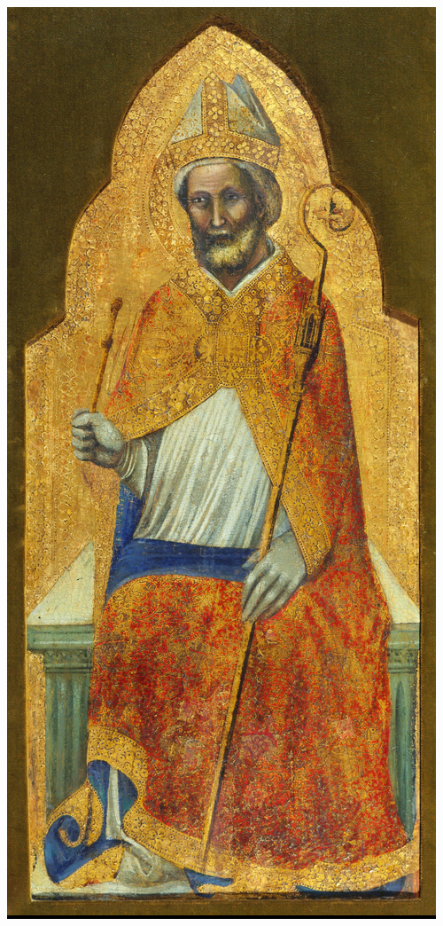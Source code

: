 \documentclass[hidelinks,12pt,a4paper,openright,twoside]{book}
\begin{document}
	
	\newpage
		
	
	\begin{minipage}{\linewidth}
		
		\begin{minipage}{0.4\linewidth}
			\begin{center}
				\colorbox{black}{\includegraphics[scale=0.06]{Vitale_da_Bologna-Santo_Ambrogio_in_trono.jpg}}
			\end{center}
		

\end{minipage}
\end{minipage}
\end{document}
